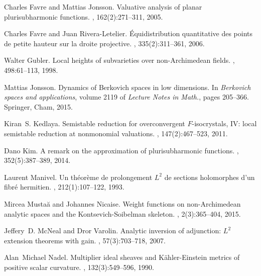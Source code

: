 \documentclass[10pt,reqno]{amsart}
\theoremstyle{plain}
\theoremstyle{definition}
\numberwithin{equation}{section}
\begin{document}
\begin{thebibliography}{BRG84}
Charles Favre and Mattias Jonsson.
\newblock Valuative analysis of planar plurisubharmonic functions.
, 162(2):271--311, 2005.

Charles Favre and Juan Rivera-Letelier.
\newblock \'{E}quidistribution quantitative des points de petite hauteur sur la
  droite projective.
, 335(2):311--361, 2006.

Walter Gubler.
\newblock Local heights of subvarieties over non-{A}rchimedean fields.
, 498:61--113, 1998.

Mattias Jonsson.
\newblock Dynamics of {B}erkovich spaces in low dimensions.
\newblock In {\em Berkovich spaces and applications}, volume 2119 of {\em
  Lecture Notes in Math.}, pages 205--366. Springer, Cham, 2015.

Kiran~S. Kedlaya.
\newblock Semistable reduction for overconvergent {$F$}-isocrystals, {IV}:
  local semistable reduction at nonmonomial valuations.
, 147(2):467--523, 2011.

Dano Kim.
\newblock A remark on the approximation of plurisubharmonic functions.
, 352(5):387--389, 2014.

Laurent Manivel.
\newblock Un th\'eor\`eme de prolongement {$L^2$} de sections holomorphes d'un
  fibr\'e hermitien.
, 212(1):107--122, 1993.


Mircea Musta{}{\u{a}} and Johannes Nicaise.
\newblock Weight functions on non-{A}rchimedean analytic spaces and the
  {K}ontsevich-{S}oibelman skeleton.
, 2(3):365--404, 2015.

Jeffery~D. McNeal and Dror Varolin.
\newblock Analytic inversion of adjunction: {$L^2$} extension theorems with
  gain.
, 57(3):703--718, 2007.

Alan~Michael Nadel.
\newblock Multiplier ideal sheaves and {K}\"ahler-{E}instein metrics of
  positive scalar curvature.
, 132(3):549--596, 1990.


\end{thebibliography}
\end{document}
